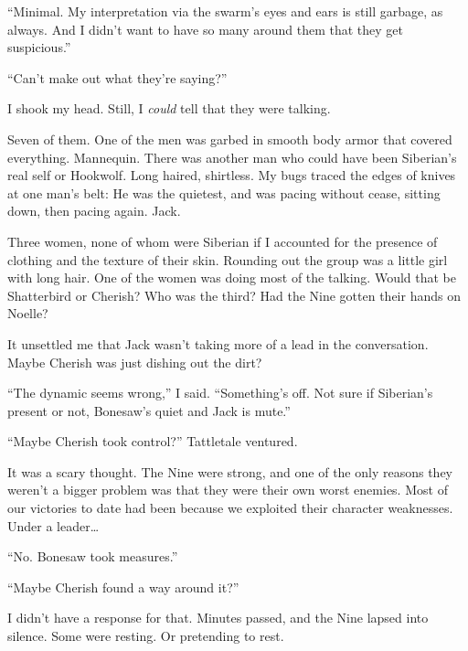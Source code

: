 ``Minimal.  My interpretation via the swarm's eyes and ears is still garbage, as always.  And I didn't want to have so many around them that they get suspicious.''



``Can't make out what they're saying?''



I shook my head.  Still, I \emph{could} tell that they were talking.



Seven of them.  One of the men was garbed in smooth body armor that covered everything.  Mannequin.  There was another man who could have been Siberian's real self or Hookwolf.  Long haired, shirtless.  My bugs traced the edges of knives at one man's belt: He was the quietest, and was pacing without cease, sitting down, then pacing again.  Jack.



Three women, none of whom were Siberian if I accounted for the presence of clothing and the texture of their skin.  Rounding out the group was a little girl with long hair.  One of the women was doing most of the talking.  Would that be Shatterbird or Cherish?  Who was the third?  Had the Nine gotten their hands on Noelle?



It unsettled me that Jack wasn't taking more of a lead in the conversation.  Maybe Cherish was just dishing out the dirt?



``The dynamic seems wrong,'' I said.  ``Something's off.  Not sure if Siberian's present or not, Bonesaw's quiet and Jack is mute.''



``Maybe Cherish took control?'' Tattletale ventured.



It was a scary thought.  The Nine were strong, and one of the only reasons they weren't a bigger problem was that they were their own worst enemies.  Most of our victories to date had been because we exploited their character weaknesses.  Under a leader\ldots



``No.  Bonesaw took measures.''



``Maybe Cherish found a way around it?''



I didn't have a response for that.  Minutes passed, and the Nine lapsed into silence.  Some were resting.  Or pretending to rest.



